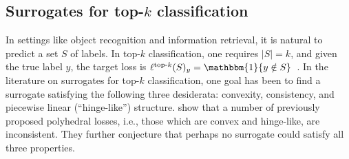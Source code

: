 \documentclass[twoside,11pt]{article}
\newcommand{\Comments}{1}
\newcommand{\mynote}[2]{\ifnum\Comments=1\textcolor{#1}{#2}\fi}
\newcommand{\mytodo}[2]{\ifnum\Comments=1%
  \todo[linecolor=#1!80!black,backgroundcolor=#1,bordercolor=#1!80!black]{#2}\fi}
\newcommand{\raft}[1]{\mytodo{green!20!white}{RF: #1}}
\newcommand{\jessie}[1]{\mynote{teal}{[JF: #1]}}
\newcommand{\jessiet}[1]{\mytodo{teal!20!white}{JF: #1}}
\newcommand{\simplex}{\Delta_\Y}
\newcommand{\Y}{\mathcal{Y}}
\newcommand{\ones}{\mathbbm{1}}
\newcommand{\elltopk}{\ell^{\text{top-$k$}}}
\begin{document}
\subsection{Surrogates for top-$k$ classification}
\label{sec:top-k}
In settings like object recognition and information retrieval, it is natural to predict a set $S$ of labels.
In top-$k$ classification, one requires $|S|=k$, and given the true label $y$, the target loss is $\elltopk(S)_y = \ones\{y\notin S\}$~\citep{lapin2015top, lapin2016loss, lapin2018analysis,yang2018consistency,berrada2018smooth,rastegari2011scalable,reddi2019stochastic}.
In the literature on surrogates for top-$k$ classification, one goal has been to find a surrogate satisfying the following three desiderata: convexity, consistency, and piecewise linear (``hinge-like'') structure.
\citet{yang2018consistency} show that a number of previously proposed polyhedral losses, i.e., those which are convex and hinge-like, are inconsistent.
They further conjecture that perhaps no surrogate could satisfy all three properties.
\end{document}

